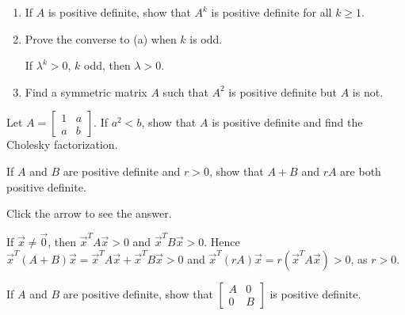 \documentclass{ximera}
\begin{document}
\begin{problem}\label{prob:pos_def_2}
\begin{enumerate}[label={\alph*.}]
\item If $A$ is positive definite, show that $A^{k}$ is positive definite for all $k \geq 1$.

\item Prove the converse to (a) when $k$ is odd.

\begin{hint}
If $\lambda^{k} > 0$, $k$ odd, then $\lambda > 0$.
\end{hint}

\item Find a symmetric matrix $A$ such that $A^{2}$ is positive definite but $A$ is not.

\end{enumerate}

\end{problem}

\begin{problem}\label{prob:pos_def_3}
Let $A = \left[ \begin{array}{rr}
1 & a \\
a & b
\end{array}\right]$. If $a^{2} < b$, show that $A$ is positive definite and find the Cholesky factorization.
\end{problem}

\begin{problem}\label{prob:pos_def_4}
If $A$ and $B$ are positive definite and $r > 0$, show that $A + B$ and $rA$ are both positive definite.

Click the arrow to see the answer.
\begin{expandable}
If $\vec{x} \neq \vec{0}$, then $\vec{x}^{T}A\vec{x} > 0$ and $\vec{x}^{T}B\vec{x} > 0$. Hence $\vec{x}^{T}(A + B)\vec{x} = \vec{x}^{T}A\vec{x} + \vec{x}^{T}B\vec{x} > 0$ and $\vec{x}^{T}(rA)\vec{x} = r(\vec{x}^{T}A\vec{x}) > 0$, as $r > 0$.
\end{expandable}

\end{problem}

\begin{problem}\label{prob:pos_def_5}
If $A$ and $B$ are positive definite, show that $\left[ \begin{array}{rr}
A & 0 \\
0 & B
\end{array}\right]$ is positive definite.
\end{problem}
\end{document}
